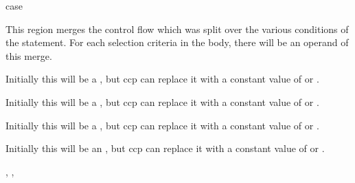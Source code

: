 \begin{instruction}{case}

  \begin{notes}
    This region merges the control flow which was split over the
    various conditions of the  statement.  For each
    selection criteria in the  body, there will be an
    operand of this merge.
  \end{notes}

  \nresults

  \begin{operands}
  \item {}
  \item {} Initially this will be
    a , but \ac{ccp} can replace it with a constant
    value of  or .
  \item {} Initially this will be
    a , but \ac{ccp} can replace it with a constant
    value of  or .
  \item {}
  \item {} Initially this
    will be a , but \ac{ccp} can replace it with a
    constant value of  or .
  \item {} Initially this will be an
    , but \ac{ccp} can replace it with a constant
    value of  or .
  \end{operands}

  \begin{seealso}
    , ,
  \end{seealso}
\end{instruction}


